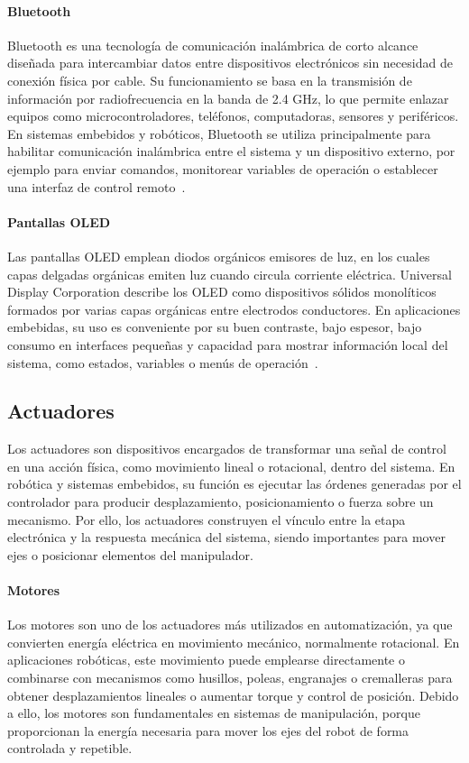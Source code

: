 \paragraph{Bluetooth} Bluetooth es una tecnología de comunicación inalámbrica de corto alcance diseñada para intercambiar datos entre dispositivos electrónicos sin necesidad de conexión física por cable. Su funcionamiento se basa en la transmisión de información por radiofrecuencia en la banda de 2.4 GHz, lo que permite enlazar equipos como microcontroladores, teléfonos, computadoras, sensores y periféricos. En sistemas embebidos y robóticos, Bluetooth se utiliza principalmente para habilitar comunicación inalámbrica entre el sistema y un dispositivo externo, por ejemplo para enviar comandos, monitorear variables de operación o establecer una interfaz de control remoto~\cite{elbendary2018bluetooth}.

\paragraph{Pantallas OLED}
Las pantallas OLED emplean diodos orgánicos emisores de luz, en los cuales capas delgadas orgánicas emiten luz cuando circula corriente eléctrica. Universal Display Corporation describe los OLED como dispositivos sólidos monolíticos formados por varias capas orgánicas entre electrodos conductores. En aplicaciones embebidas, su uso es conveniente por su buen contraste, bajo espesor, bajo consumo en interfaces pequeñas y capacidad para mostrar información local del sistema, como estados, variables o menús de operación~\cite{udcOLED}.

\subsection{Actuadores}
Los actuadores son dispositivos encargados de transformar una señal de control en una acción física, como movimiento lineal o rotacional, dentro del sistema. En robótica y sistemas embebidos, su función es ejecutar las órdenes generadas por el controlador para producir desplazamiento, posicionamiento o fuerza sobre un mecanismo. Por ello, los actuadores construyen el vínculo entre la etapa electrónica y la respuesta mecánica del sistema, siendo importantes para mover ejes o posicionar elementos del manipulador.

\paragraph{Motores}
Los motores son uno de los actuadores más utilizados en automatización, ya que convierten energía eléctrica en movimiento mecánico, normalmente rotacional. En aplicaciones robóticas, este movimiento puede emplearse directamente o combinarse con mecanismos como husillos, poleas, engranajes o cremalleras para obtener desplazamientos lineales o aumentar torque y control de posición. Debido a ello, los motores son fundamentales en sistemas de manipulación, porque proporcionan la energía necesaria para mover los ejes del robot de forma controlada y repetible.

